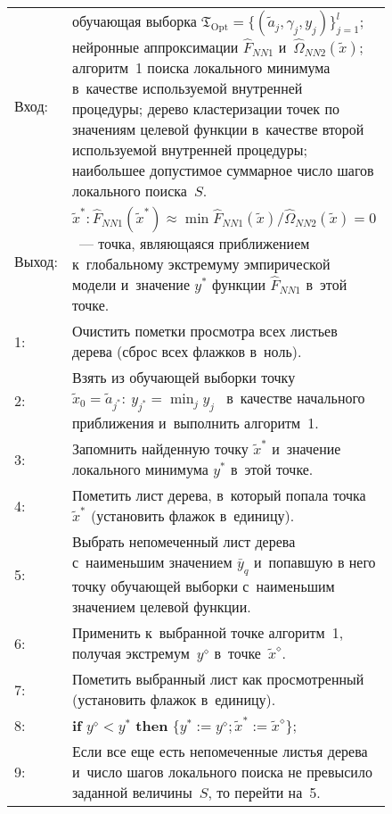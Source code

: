 \begin{multicols}{2}
\begin{figure*}[b]
{\small 
\begin{center}
\begin{tabular}{l p{146.7mm}}
\hline
Вход: & обучающая выборка $\mathfrak{T}_{\mathrm{Opt}}=\{ 
(\tilde{a}_j,\gamma_j,y_j)\}_{j=1}^l$; нейронные аппроксимации 
$\hat{F}_{NN1}$
и~$\hat{\Omega}_{NN2}(\tilde{x})$; алгоритм~1 поиска локального 
минимума в~качестве  используемой
внут\-рен\-ней процедуры; дерево кластеризации точек по значениям целевой
функции в~качестве второй используемой внутренней процедуры; наибольшее
допустимое суммарное число шагов локального поиска~$S$.\\
Выход: &
$\tilde{x}^{*}: \hat{F}_{NN1}(\tilde{x}^{*})\approx 
\min \hat{F}_{NN1}(\tilde{x})  / \hat{\Omega}_{NN2}(\tilde{x}) = 0$~--- 
точка, являющаяся
приближением к~глобальному экстремуму эмпирической  модели и~значение
$y^{*}$ функции $\hat{F}_{NN1}$ в~этой точке.\\
\hline
1:& Очистить пометки просмотра всех листьев дерева (сброс всех флажков в~ноль).\\
2: &Взять из обучающей выборки точку $\tilde{x}_0=\tilde{a}_{j^{*}}: \ y_{j^{*}}= \min_j y_j$ \ в~качестве
начального приближения и~выполнить алгоритм~1.\\
3: &Запомнить найденную точку  $\tilde{x}^{*}$ и~значение локального минимума $y^{*}$ в~этой точке.\\
4: &Пометить лист дерева, в~который попала точка $\tilde{x}^{*}$ (установить флажок в~единицу).\\
5: &Выбрать непомеченный лист дерева с~наименьшим значением $\bar{y}_q$ и~попавшую
в него точку обучающей выборки с~наименьшим значением целевой функции.\\
6: &Применить к~выбранной точке алгоритм~1, 
получая экстремум~$y^{\diamond}$ в~точке~$\tilde{x}^{\diamond}$.\\
7: &Пометить выбранный лист как просмотренный (установить флажок в~единицу).\\
8: &\textbf{if}  $y^{\diamond} < y^{*}$  \textbf{then} 
$\{y^{*}:=y^{\diamond}; \tilde{x}^{*}:= \tilde{x}^{\diamond} \}$;\\
9: &Если все еще есть непомеченные листья дерева и~число шагов локального поиска
не превысило заданной величины~$S$, то перейти на~5.\\
\hline
\end{tabular}
\end{center}
}
\end{figure*}


\end{multicols}
